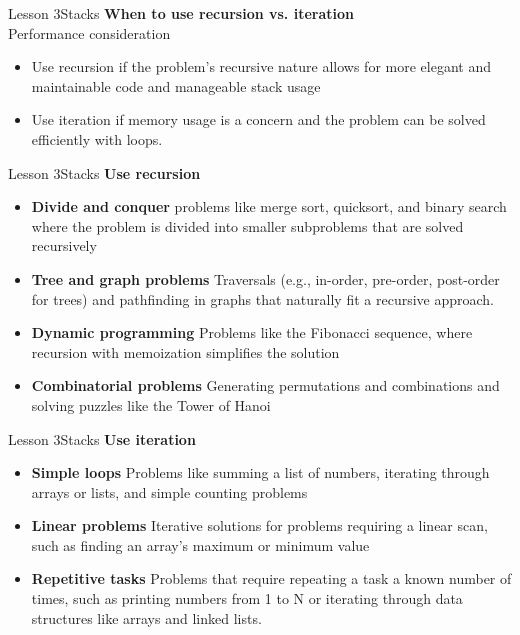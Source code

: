 \documentclass[aspectratio=1610]{beamer}
\begin{document}
\begin{frame}{Lesson 3}{Stacks}
\LARGE
\textbf{When to use recursion vs. iteration}\\
Performance consideration
\begin{itemize}
    \item Use recursion if the problem’s recursive nature allows for more elegant and maintainable code and manageable stack usage
    \item Use iteration if memory usage is a concern and the problem can be solved efficiently with loops.
\end{itemize}
\end{frame}


\begin{frame}{Lesson 3}{Stacks}
\LARGE
\textbf{Use recursion}\\
\Large
\begin{itemize}
    \item \textbf{Divide and conquer} problems like merge sort, quicksort, and binary search where the problem is divided into smaller subproblems that are solved recursively 
    \item \textbf{Tree and graph problems} Traversals (e.g., in-order, pre-order, post-order for trees) and pathfinding in graphs that naturally fit a recursive approach.
    \item \textbf{Dynamic programming} Problems like the Fibonacci sequence, where recursion with memoization simplifies the solution
    \item \textbf{Combinatorial problems} Generating permutations and combinations and solving puzzles like the Tower of Hanoi
\end{itemize}
\end{frame}



\begin{frame}{Lesson 3}{Stacks}
\LARGE
\textbf{Use iteration}\\
\Large
\begin{itemize}
    \item \textbf{Simple loops} Problems like summing a list of numbers, iterating through arrays or lists, and simple counting problems
    \item \textbf{Linear problems} Iterative solutions for problems requiring a linear scan, such as finding an array’s maximum or minimum value
    \item  \textbf{Repetitive tasks} Problems that require repeating a task a known number of times, such as printing numbers from 1 to N or iterating through data structures like arrays and linked lists.
\end{itemize}
\end{frame}
\end{document}
